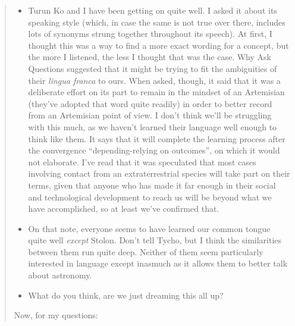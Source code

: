\begin{quote}
\begin{itemize}
\item
  Turun Ko and I have been getting on quite well. I asked it about its speaking style (which, in case the same is not true over there, includes lots of synonyms strung together throughout its speech). At first, I thought this was a way to find a more exact wording for a concept, but the more I listened, the less I thought that was the case. Why Ask Questions suggested that it might be trying to fit the ambiguities of their \emph{lingua franca} to ours. When asked, though, it said that it was a deliberate effort on its part to remain in the mindset of an Artemisian (they've adopted that word quite readily) in order to better record from an Artemisian point of view. I don't think we'll be struggling with this much, as we haven't learned their language well enough to think like them. It says that it will complete the learning process after the convergence ``depending-relying on outcomes'', on which it would not elaborate. I've read that it was speculated that most cases involving contact from an extraterrestrial species will take part on their terms, given that anyone who has made it far enough in their social and technological development to reach us will be beyond what we have accomplished, so at least we've confirmed that.
\item
  On that note, everyone seems to have learned our common tongue quite well \emph{except} Stolon. Don't tell Tycho, but I think the similarities between them run quite deep. Neither of them seem particularly interested in language except inasmuch as it allows them to better talk about astronomy.
\item
  What do you think, are we just dreaming this all up?
\end{itemize}

Now, for my questions:


\end{quote}
